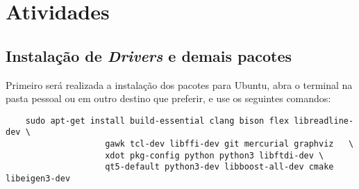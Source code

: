 \documentclass{article}
\begin{document}
\section{Atividades}



\subsection{Instalação de \textit{Drivers} e demais pacotes}
\textnormal{Primeiro será realizada a instalação dos pacotes para Ubuntu, abra o terminal na pasta pessoal ou em outro destino que preferir, e use os seguintes comandos:}

\begin{verbatim}
    sudo apt-get install build-essential clang bison flex libreadline-dev \
                    gawk tcl-dev libffi-dev git mercurial graphviz   \
                    xdot pkg-config python python3 libftdi-dev \
                    qt5-default python3-dev libboost-all-dev cmake libeigen3-dev
\end{verbatim}
\end{document}

